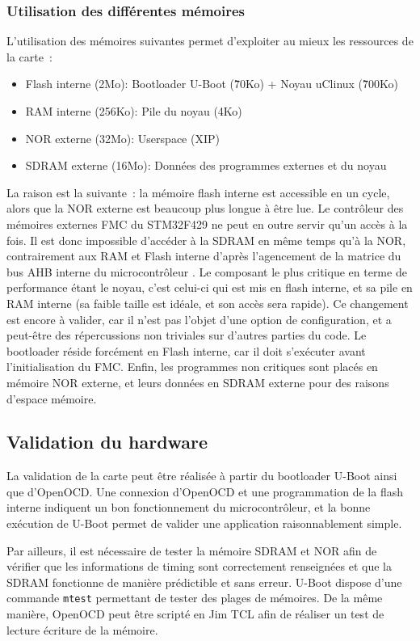 \subsubsection{Utilisation des différentes mémoires}
L'utilisation des mémoires suivantes permet d'exploiter au mieux les ressources de la carte~:
\begin{itemize}
	\item Flash interne (2Mo): Bootloader U-Boot (\~70Ko) + Noyau uClinux (\~700Ko)
	\item RAM interne (256Ko): Pile du noyau (4Ko)
	\item NOR externe (32Mo): Userspace (XIP)
	\item SDRAM externe (16Mo): Données des programmes externes et du noyau
\end{itemize}
La raison est la suivante~: la mémoire flash interne est accessible en un cycle, alors que la NOR externe est beaucoup plus longue à être lue.
Le contrôleur des mémoires externes \gls{FMC} du STM32F429 ne peut en outre servir qu'un accès à la fois.
Il est donc impossible d'accéder à la SDRAM en même temps qu'à la NOR, contrairement aux RAM et Flash interne d'après l'agencement de la matrice du bus \gls{AHB} interne du microcontrôleur \autocite{STM:ReferenceManual}.
Le composant le plus critique en terme de performance étant le noyau, c'est celui-ci qui est mis en flash interne, et sa pile en RAM interne (sa faible taille est idéale, et son accès sera rapide).
Ce changement est encore à valider, car il n'est pas l'objet d'une option de configuration, et a peut-être des répercussions non triviales sur d'autres parties du code.
Le bootloader réside forcément en Flash interne, car il doit s'exécuter avant l'initialisation du \gls{FMC}.
Enfin, les programmes non critiques sont placés en mémoire NOR externe, et leurs données en SDRAM externe pour des raisons d'espace mémoire.


\subsection{Validation du hardware}
La validation de la carte peut être réalisée à partir du bootloader U-Boot ainsi que d'OpenOCD.
Une connexion d'OpenOCD et une programmation de la flash interne indiquent un bon fonctionnement du microcontrôleur, et la bonne exécution de U-Boot permet de valider une application  raisonnablement simple.
        
Par ailleurs, il est nécessaire de tester la mémoire SDRAM et NOR afin de vérifier que les informations de timing sont correctement renseignées et que la SDRAM fonctionne de manière prédictible et sans erreur. 
U-Boot dispose d'une commande \texttt{mtest} permettant de tester des plages de mémoires.
De la même manière, OpenOCD peut être scripté en Jim TCL afin de réaliser un test de lecture écriture de la mémoire.
	
